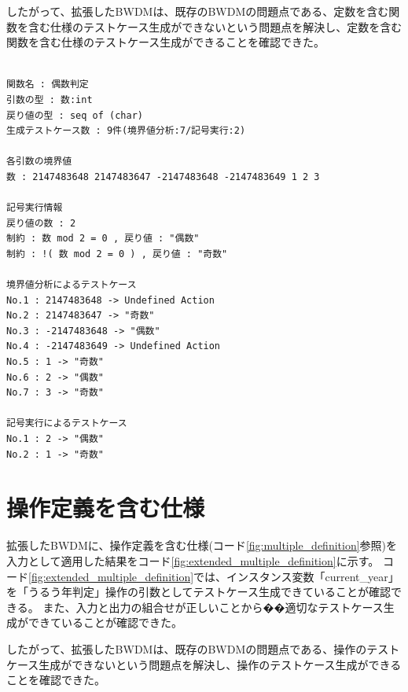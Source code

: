 \documentclass[uplatex, report, a4j, 10pt]{jsbook}
\begin{document}
したがって、拡張したBWDMは、既存のBWDMの問題点である、定数を含む関数を含む仕様のテストケース生成ができないという問題点を解決し、定数を含む関数を含む仕様のテストケース生成ができることを確認できた。

\lstset{language=}
\noindent\begin{minipage}{\textwidth}
  \begin{lstlisting}[caption=拡張したBWDMに、定数を含む関数を含む仕様(コード\ref{fig:func_multiple})を適用した際の出力,label=fig:extended_value_definition_result]

関数名 : 偶数判定
引数の型 : 数:int 
戻り値の型 : seq of (char)
生成テストケース数 : 9件(境界値分析:7/記号実行:2)

各引数の境界値
数 : 2147483648 2147483647 -2147483648 -2147483649 1 2 3 

記号実行情報
戻り値の数 : 2
制約 : 数 mod 2 = 0 , 戻り値 : "偶数"
制約 : !( 数 mod 2 = 0 ) , 戻り値 : "奇数"

境界値分析によるテストケース
No.1 : 2147483648 -> Undefined Action
No.2 : 2147483647 -> "奇数"
No.3 : -2147483648 -> "偶数"
No.4 : -2147483649 -> Undefined Action
No.5 : 1 -> "奇数"
No.6 : 2 -> "偶数"
No.7 : 3 -> "奇数"

記号実行によるテストケース
No.1 : 2 -> "偶数"
No.2 : 1 -> "奇数"

\end{lstlisting}
\end{minipage}

\section{操作定義を含む仕様}
拡張したBWDMに、操作定義を含む仕様(コード\ref{fig:multiple_definition}参照)を入力として適用した結果をコード\ref{fig:extended_multiple_definition}に示す。
コード\ref{fig:extended_multiple_definition}では、インスタンス変数「current\_year」を「うるう年判定」操作の引数としてテストケース生成できていることが確認できる。
また、入力と出力の組合せが正しいことから��適切なテストケース生成ができていることが確認できた。

したがって、拡張したBWDMは、既存のBWDMの問題点である、操作のテストケース生成ができないという問題点を解決し、操作のテストケース生成ができることを確認できた。
\end{document}

